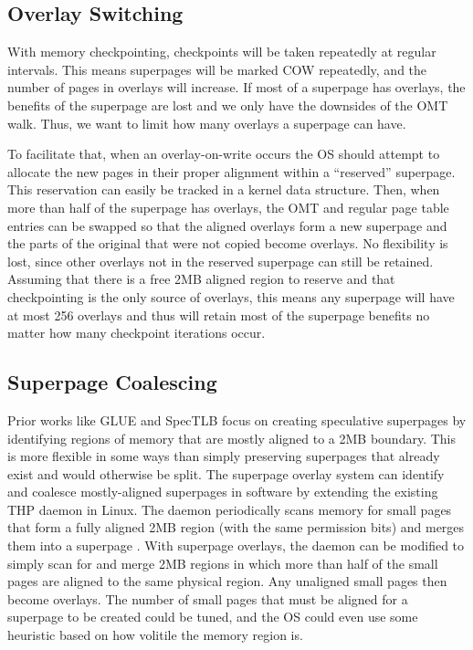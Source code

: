 \subsection{Overlay Switching}
With memory checkpointing, checkpoints will be taken repeatedly at regular intervals. This means superpages will be marked COW repeatedly, and the number of pages in overlays will increase. If most of a superpage has overlays, the benefits of the superpage are lost and we only have the downsides of the OMT walk. Thus, we want to limit how many overlays a superpage can have.

To facilitate that, when an overlay-on-write occurs the OS should attempt to allocate the new pages in their proper alignment within a ``reserved'' superpage. This reservation can easily be tracked in a kernel data structure. Then, when more than half of the superpage has overlays, the OMT and regular page table entries can be swapped so that the aligned overlays form a new superpage and the parts of the original that were not copied become overlays. No flexibility is lost, since other overlays not in the reserved superpage can still be retained. Assuming that there is a free 2MB aligned region to reserve and that checkpointing is the only source of overlays, this means any superpage will have at most 256 overlays and thus will retain most of the superpage benefits no matter how many checkpoint iterations occur.

\subsection{Superpage Coalescing}
Prior works like GLUE \cite{Pham} and SpecTLB \cite{Barr} focus on creating speculative superpages by identifying regions of memory that are mostly aligned to a 2MB boundary. This is more flexible in some ways than simply preserving superpages that already exist and would otherwise be split. The superpage overlay system can identify and coalesce mostly-aligned superpages in software by extending the existing THP daemon in Linux. The daemon periodically scans memory for small pages that form a fully aligned 2MB region (with the same permission bits) and merges them into a superpage \cite{THP}. With superpage overlays, the daemon can be modified to simply scan for and merge 2MB regions in which more than half of the small pages are aligned to the same physical region. Any unaligned small pages then become overlays. The number of small pages that must be aligned for a superpage to be created could be tuned, and the OS could even use some heuristic based on how volitile the memory region is.

